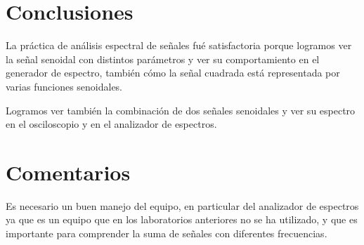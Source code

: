 \documentclass{article}
\begin{document}
\section{Conclusiones}

La práctica de análisis espectral de señales fué satisfactoria porque logramos ver la señal senoidal con distintos parámetros y ver su comportamiento en el generador de espectro, también cómo la señal cuadrada está representada por varias funciones senoidales.

Logramos ver también la combinación de dos señales senoidales y ver su espectro en el osciloscopio y en el analizador de espectros.

\section{Comentarios}

Es necesario un buen manejo del equipo, en particular del analizador de espectros ya que es un equipo que en los laboratorios anteriores no se ha utilizado, y que es importante para comprender la suma de señales con diferentes frecuencias.



\end{document}
